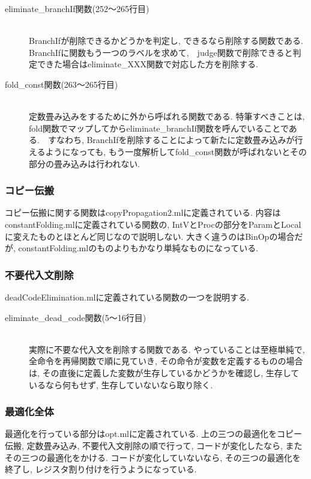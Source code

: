 \documentclass{jarticle}
\begin{document}
\begin{description}
\item[eliminate\_branchIf関数(252〜265行目)] \leavevmode \\
BranchIfが削除できるかどうかを判定し, できるなら削除する関数である. BranchIfに関数もう一つのラベルを求めて,　judge関数で削除できると判定できた場合はeliminate\_XXX関数で対応した方を削除する.
\item[fold\_const関数(263〜265行目)] \leavevmode \\
定数畳み込みをするために外から呼ばれる関数である. 特筆すべきことは, fold関数でマップしてからeliminate\_branchIf関数を呼んでいることである.　すなわち, BranchIfを削除することによって新たに定数畳み込みが行えるようになっても, もう一度解析してfold\_const関数が呼ばれないとその部分の畳み込みは行われない.
\end{description}
\subsubsection{コピー伝搬}
コピー伝搬に関する関数はcopyPropagation2.mlに定義されている. 内容はconstantFolding.mlに定義されている関数の, IntVとProcの部分をParamとLocalに変えたものとほとんど同じなので説明しない. 大きく違うのはBinOpの場合だが, constantFolding.mlのものよりもかなり単純なものになっている.
\subsubsection{不要代入文削除}
deadCodeElimination.mlに定義されている関数の一つを説明する.
\begin{description}
\item[eliminate\_dead\_code関数(5〜16行目)] \leavevmode \\
実際に不要な代入文を削除する関数である. やっていることは至極単純で, 全命令を再帰関数で順に見ていき, その命令が変数を定義するものの場合は, その直後に定義した変数が生存しているかどうかを確認し, 生存しているなら何もせず, 生存していないなら取り除く.
\end{description}
\subsubsection{最適化全体}
最適化を行っている部分はopt.mlに定義されている. 上の三つの最適化をコピー伝搬, 定数畳み込み, 不要代入文削除の順で行って, コードが変化したなら, またその三つの最適化をかける. コードが変化していないなら, その三つの最適化を終了し, レジスタ割り付けを行うようになっている.
\end{document}
